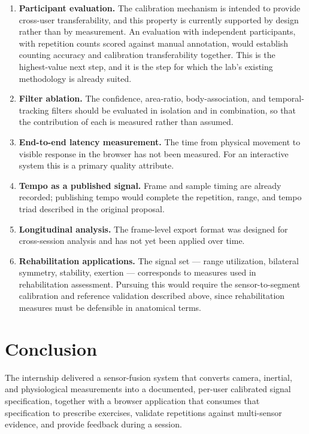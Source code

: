 \documentclass[11pt,a4paper]{article}
\begin{document}
\begin{enumerate}
\item \textbf{Participant evaluation.} The calibration mechanism is intended to
provide cross-user transferability, and this property is currently supported by
design rather than by measurement. An evaluation with independent participants,
with repetition counts scored against manual annotation, would establish counting
accuracy and calibration transferability together. This is the highest-value next
step, and it is the step for which the lab's existing methodology is already
suited.

\item \textbf{Filter ablation.} The confidence, area-ratio, body-association, and
temporal-tracking filters should be evaluated in isolation and in combination, so
that the contribution of each is measured rather than assumed.

\item \textbf{End-to-end latency measurement.} The time from physical movement to
visible response in the browser has not been measured. For an interactive system
this is a primary quality attribute.

\item \textbf{Tempo as a published signal.} Frame and sample timing are already
recorded; publishing tempo would complete the repetition, range, and tempo triad
described in the original proposal.

\item \textbf{Longitudinal analysis.} The frame-level export format was designed
for cross-session analysis and has not yet been applied over time.

\item \textbf{Rehabilitation applications.} The signal set --- range utilization,
bilateral symmetry, stability, exertion --- corresponds to measures used in
rehabilitation assessment. Pursuing this would require the sensor-to-segment
calibration and reference validation described above, since rehabilitation
measures must be defensible in anatomical terms.
\end{enumerate}

\section{Conclusion}

The internship delivered a sensor-fusion system that converts camera, inertial,
and physiological measurements into a documented, per-user calibrated signal
specification, together with a browser application that consumes that
specification to prescribe exercises, validate repetitions against multi-sensor
evidence, and provide feedback during a session.
\end{document}
